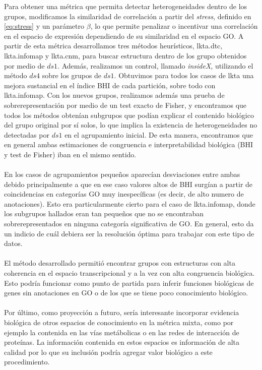 Para obtener una métrica que permita detectar heterogeneidades dentro de los grupos, modificamos la similaridad de correlación a partir del \textit{stress}, definido en \ref{eq:stress} y un parámetro $\beta$, lo que permite penalizar o incentivar una correlación en el espacio de expresión dependiendo de su similaridad en el espacio GO. A partir de esta métrica desarrollamos tres métodos heurísticos, lkta.dtc, lkta.infomap y lkta.cnm, para buscar estructura dentro de los grupo obtenidos por medio de $ds1$. Además, realizamos un control, llamado \textit{insideX}, utilizando el método $ds4$ sobre los grupos de $ds1$. Obtuvimos para todos los casos de lkta una mejora sustancial en el índice BHI de cada partición, sobre todo con lkta.infomap. Con los nuevos grupos, realizamos además una prueba de sobrerepresentación por medio de un test exacto de Fisher, y encontramos que todos los métodos obtenían subgrupos que podían explicar el contenido biológico del grupo original por sí solos, lo que implica la existencia de heterogeneidades no detectadas por $ds1$ en el agrupamiento inicial. De esta manera, encontramos que en general ambas estimaciones de congruencia e interpretabilidad biológica (BHI y test de Fisher) iban en el mismo sentido.\\\\
En los casos de agrupamientos pequeños aparecían desviaciones entre ambas debido principalmente a que en ese caso valores altos de BHI surgían a partir de coincidencias en categorías GO muy inespecíficas (es decir, de alto numero de anotaciones). Esto era particularmente cierto para el caso de lkta.infomap, donde los subgrupos hallados eran tan pequeños que no se encontraban sobrerepresentados en ninguna categoría significativa de GO. En general, esto da un indicio de cuál debiera ser la resolución óptima para trabajar con este tipo de datos.\\\\
El método desarrollado permitió encontrar grupos con estructuras con alta coherencia en el espacio transcripcional y a la vez con alta congruencia biológica. Esto podría funcionar como punto de partida para inferir funciones biológicas de genes sin anotaciones en GO o de los que se tiene poco conocimiento biológico.\\\\
Por último, como proyección a futuro, sería interesante incorporar evidencia biológica de otros espacios de conocimiento en la métrica mixta, como por ejemplo la contenida en las vías metábolicas o en las redes de interacción de proteínas. La información contenida en estos espacios es información de alta calidad por lo que su inclusión podría agregar valor biológico a este procedimiento.\\\\

